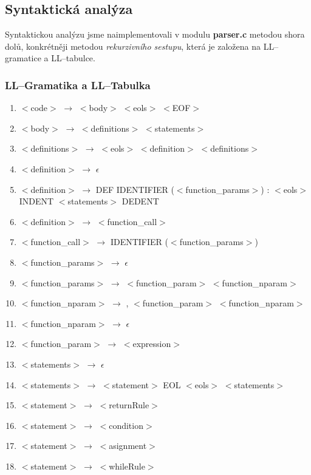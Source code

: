 \documentclass[12pt]{article}
\begin{document}
\subsection{Syntaktická analýza}
Syntaktickou analýzu jsme naimplementovali v modulu \textbf{parser.c} metodou shora dolů, konkrétněji metodou \textit{rekurzivního sestupu}, která je založena na LL--gramatice a LL--tabulce.
\subsubsection{LL--Gramatika a LL--Tabulka}
\begin{enumerate}
    \item $<$code$>$ $\rightarrow$ $<$body$>$  $<$eols$>$  $<$EOF$>$
    \item $<$body$>$ $\rightarrow$ $<$definitions$>$ $<$statements$>$
    \item $<$definitions$>$ $\rightarrow$ $<$eols$>$ $<$definition$>$ $<$definitions$>$
    \item $<$definition$>$ $\rightarrow$ $\epsilon$
    \item $<$definition$>$ $\rightarrow$ DEF IDENTIFIER ($<$function\_params$>$) : $<$eols$>$ INDENT $<$statements$>$ DEDENT
    \item $<$definition$>$ $\rightarrow$ $<$function\_call$>$
    \item $<$function\_call$>$ $\rightarrow$ IDENTIFIER ($<$function\_params$>$)
    \item $<$function\_params$>$ $\rightarrow$ $\epsilon$
    \item $<$function\_params$>$ $\rightarrow$ $<$function\_param$>$ $<$function\_nparam$>$
    \item $<$function\_nparam$>$ $\rightarrow$ , $<$function\_param$>$ $<$function\_nparam$>$
    \item $<$function\_nparam$>$ $\rightarrow$ $\epsilon$
    \item $<$function\_param$>$ $\rightarrow$ $<$expression$>$
    \item $<$statements$>$ $\rightarrow$ $\epsilon$
    \item $<$statements$>$ $\rightarrow$ $<$statement$>$ EOL $<$eols$>$ $<$statements$>$
    \item $<$statement$>$ $\rightarrow$ $<$returnRule$>$
    \item $<$statement$>$ $\rightarrow$ $<$condition$>$
    \item $<$statement$>$ $\rightarrow$ $<$asignment$>$
    \item $<$statement$>$ $\rightarrow$ $<$whileRule$>$

\end{enumerate}
\end{document}
